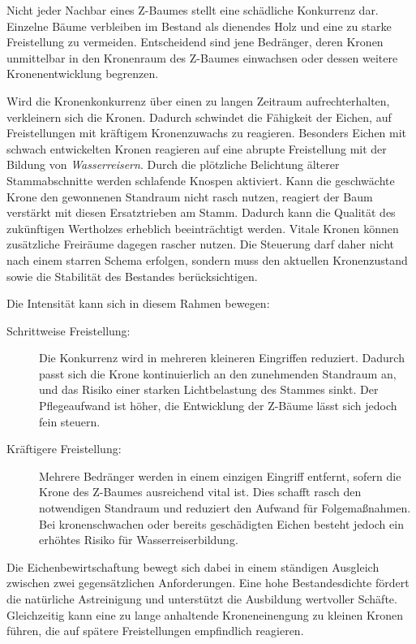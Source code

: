 \documentclass[twocolumn, bibliography=totoc, abstract=true]{scrartcl}
\begin{document}
Nicht jeder Nachbar eines Z-Baumes stellt eine schädliche Konkurrenz dar. Einzelne Bäume verbleiben im Bestand als dienendes Holz und eine zu starke Freistellung zu vermeiden. Entscheidend sind jene Bedränger, deren Kronen unmittelbar in den Kronenraum des Z-Baumes einwachsen oder dessen weitere Kronenentwicklung begrenzen.

Wird die Kronenkonkurrenz über einen zu langen Zeitraum aufrechterhalten, verkleinern sich die Kronen. Dadurch schwindet die Fähigkeit der Eichen, auf Freistellungen mit kräftigem Kronenzuwachs zu reagieren. Besonders Eichen mit schwach entwickelten Kronen reagieren auf eine abrupte Freistellung mit der Bildung von \emph{Wasserreisern}. Durch die plötzliche Belichtung älterer Stammabschnitte werden schlafende Knospen aktiviert. Kann die geschwächte Krone den gewonnenen Standraum nicht rasch nutzen, reagiert der Baum verstärkt mit diesen Ersatztrieben am Stamm. Dadurch kann die Qualität des zukünftigen Wertholzes erheblich beeinträchtigt werden. Vitale Kronen können zusätzliche Freiräume dagegen rascher nutzen. Die Steuerung darf daher nicht nach einem starren Schema erfolgen, sondern muss den aktuellen Kronenzustand sowie die Stabilität des Bestandes berücksichtigen.

Die Intensität kann sich in diesem Rahmen bewegen:

\begin{description}
\item[Schrittweise Freistellung:] Die Konkurrenz wird in mehreren kleineren Eingriffen reduziert. Dadurch passt sich die Krone kontinuierlich an den zunehmenden Standraum an, und das Risiko einer starken Lichtbelastung des Stammes sinkt. Der Pflegeaufwand ist höher, die Entwicklung der Z-Bäume lässt sich jedoch fein steuern.
\item[Kräftigere Freistellung:] Mehrere Bedränger werden in einem einzigen Eingriff entfernt, sofern die Krone des Z-Baumes ausreichend vital ist. Dies schafft rasch den notwendigen Standraum und reduziert den Aufwand für Folgemaßnahmen. Bei kronenschwachen oder bereits geschädigten Eichen besteht jedoch ein erhöhtes Risiko für Wasserreiserbildung.
\end{description}

Die Eichenbewirtschaftung bewegt sich dabei in einem ständigen Ausgleich zwischen zwei gegensätzlichen Anforderungen. Eine hohe Bestandesdichte fördert die natürliche Astreinigung und unterstützt die Ausbildung wertvoller Schäfte. Gleichzeitig kann eine zu lange anhaltende Kroneneinengung zu kleinen Kronen führen, die auf spätere Freistellungen empfindlich reagieren.
\end{document}
